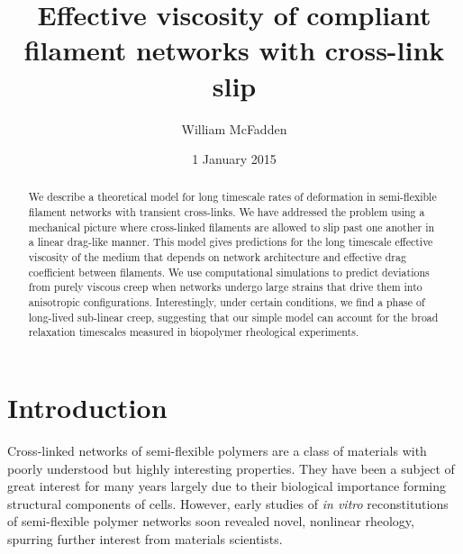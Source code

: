 \documentclass[pre,preprint]{revtex4-1}
\begin{document}
\title{Effective viscosity of compliant filament networks with cross-link slip}
\author{William McFadden}

\date{1 January 2015}

\begin{abstract}
We describe a theoretical model for long timescale rates of deformation in semi-flexible filament networks with transient cross-links.  We have addressed the problem using a mechanical picture where cross-linked filaments are allowed to slip past one another in a linear drag-like manner.  This model gives predictions for the long timescale effective viscosity of the medium that depends on network architecture and effective drag coefficient between filaments.  We use computational simulations to predict deviations from purely viscous creep when networks undergo large strains that drive them into anisotropic configurations.  Interestingly, under certain conditions, we find a phase of long-lived sub-linear creep, suggesting that our simple model can account for the broad relaxation timescales measured in biopolymer rheological experiments.
\end{abstract}

\maketitle


\tableofcontents


















\section{Introduction}

Cross-linked networks of semi-flexible polymers are a class of materials with poorly understood but highly interesting properties.  They have been a subject of great interest for many years largely due to their biological importance forming structural components of cells\cite{cellmech_review1,cellmech_review2}.  However, early studies of {\em in vitro} reconstitutions of semi-flexible polymer networks soon revealed novel, nonlinear rheology, spurring further interest from materials scientists\cite{megareview}.  
\end{document}
